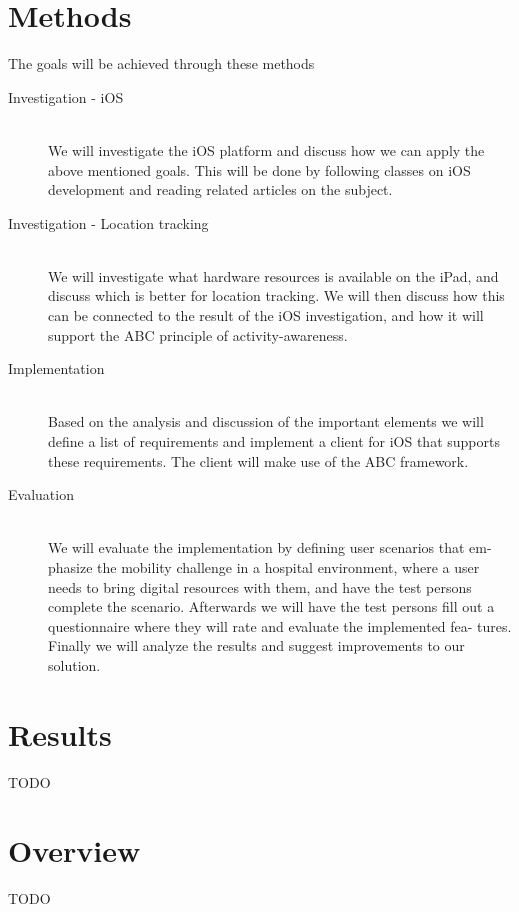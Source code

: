 \section{Methods}
The goals will be achieved through these methods

\begin{description}
  \item[Investigation - iOS] \hfill \\
  We will investigate the iOS platform and discuss how we can apply the above mentioned goals. This will be done by following classes on iOS development and reading related articles on the subject.

  \item[Investigation - Location tracking] \hfill \\
We will investigate what hardware resources is available on the iPad, and discuss which is better for location tracking. We will then discuss how this can be connected to the result of the iOS investigation, and how it will support the ABC principle of activity-awareness.

  \item[Implementation] \hfill \\
  Based on the analysis and discussion of the important elements we will define a list of requirements and implement a client for iOS that supports these requirements. The client will make use of the ABC framework.
  
  \item[Evaluation] \hfill \\
We will evaluate the implementation by defining user scenarios that em- phasize the mobility challenge in a hospital environment, where a user needs to bring digital resources with them, and have the test persons complete the scenario. Afterwards we will have the test persons fill out a questionnaire where they will rate and evaluate the implemented fea- tures. Finally we will analyze the results and suggest improvements to our solution.
\end{description}

\section{Results}
TODO

\section{Overview}
TODO